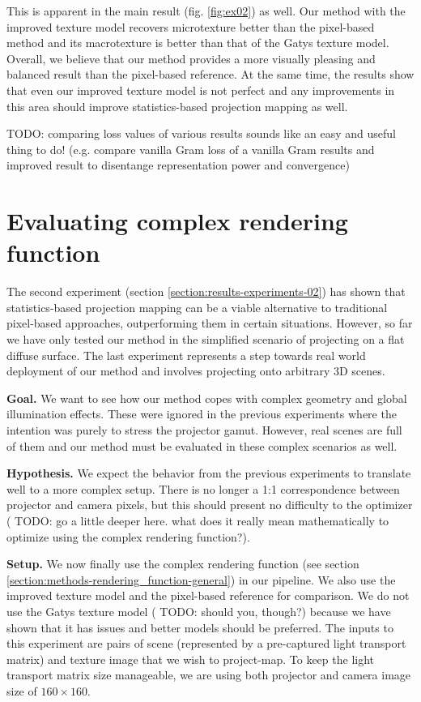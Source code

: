 This is apparent in the main result (fig. \ref{fig:ex02}) as well. Our method with the improved texture model recovers microtexture better than the pixel-based method and its macrotexture is better than that of the Gatys texture model. Overall, we believe that our method provides a more visually pleasing and balanced result than the pixel-based reference. At the same time, the results show that even our improved texture model is not perfect and any improvements in this area should improve statistics-based projection mapping as well.

{\color{red} TODO: comparing loss values of various results sounds like an easy and useful thing to do! (e.g. compare vanilla Gram loss of a vanilla Gram results and improved result to disentange representation power and convergence)}

\section{Evaluating complex rendering function}
\label{section:results-experiments-03}

The second experiment (section \ref{section:results-experiments-02}) has shown that statistics-based projection mapping can be a viable alternative to traditional pixel-based approaches, outperforming them in certain situations. However, so far we have only tested our method in the simplified scenario of projecting on a flat diffuse surface. The last experiment represents a step towards real world deployment of our method and involves projecting onto arbitrary 3D scenes.

\textbf{Goal.} We want to see how our method copes with complex geometry and global illumination effects. These were ignored in the previous experiments where the intention was purely to stress the projector gamut. However, real scenes are full of them and our method must be evaluated in these complex scenarios as well.

\textbf{Hypothesis.} We expect the behavior from the previous experiments to translate well to a more complex setup. There is no longer a 1:1 correspondence between projector and camera pixels, but this should present no difficulty to the optimizer ({\color{red} TODO: go a little deeper here. what does it really mean mathematically to optimize using the complex rendering function?}).

\textbf{Setup.} We now finally use the complex rendering function (see section \ref{section:methods-rendering_function-general}) in our pipeline. We also use the improved texture model and the pixel-based reference for comparison. We do not use the Gatys texture model ({\color{red} TODO: should you, though?}) because we have shown that it has issues and better models should be preferred. The inputs to this experiment are pairs of scene (represented by a pre-captured light transport matrix) and texture image that we wish to project-map. To keep the light transport matrix size manageable, we are using both projector and camera image size of \(160 \times 160\).

